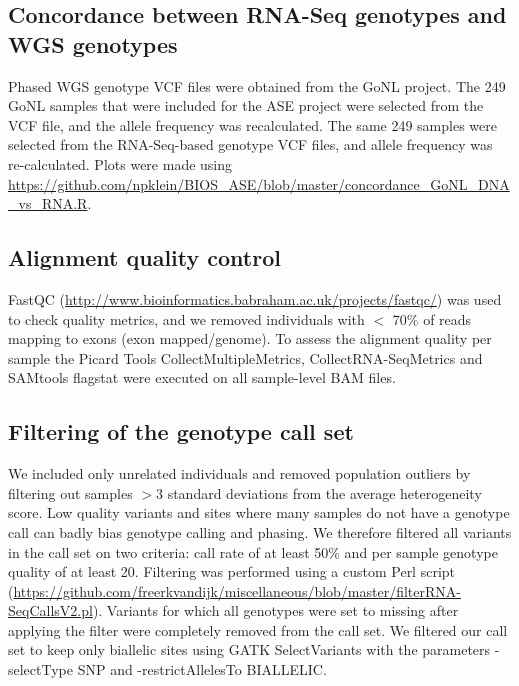 \subsection{Concordance between RNA-Seq genotypes and WGS genotypes}
Phased WGS genotype VCF files were obtained from the GoNL project\cite{francioliWholegenomeSequenceVariation2014}. The 249 GoNL samples that were included for the ASE project were selected from the VCF file, and the allele frequency was recalculated. The same 249 samples were selected from the RNA-Seq-based genotype VCF files, and allele frequency was re-calculated. Plots were made using \url{https://github.com/npklein/BIOS\_ASE/blob/master/concordance\_GoNL\_DNA\_vs\_RNA.R}. 

\subsection{Alignment quality control}
FastQC (\url{http://www.bioinformatics.babraham.ac.uk/projects/fastqc/}) was used to check quality metrics, and we removed individuals with $<$ 70\% of reads mapping to exons (exon mapped/genome). To assess the alignment quality per sample the Picard Tools CollectMultipleMetrics, CollectRNA-SeqMetrics and SAMtools flagstat were executed on all sample-level BAM files.

\subsection{Filtering of the genotype call set}
We included only unrelated individuals and removed population outliers by filtering out samples $>$3 standard deviations from the average heterogeneity score. Low quality variants and sites where many samples do not have a genotype call can badly bias genotype calling and phasing. We therefore filtered all variants in the call set on two criteria: call rate of at least 50\% and per sample genotype quality of at least 20. Filtering was performed using a custom Perl script (\url{https://github.com/freerkvandijk/miscellaneous/blob/master/filterRNA-SeqCallsV2.pl}). Variants for which all genotypes were set to missing after applying the filter were completely removed from the call set. We filtered our call set to keep only biallelic sites using GATK SelectVariants with the parameters -selectType SNP and -restrictAllelesTo BIALLELIC.

